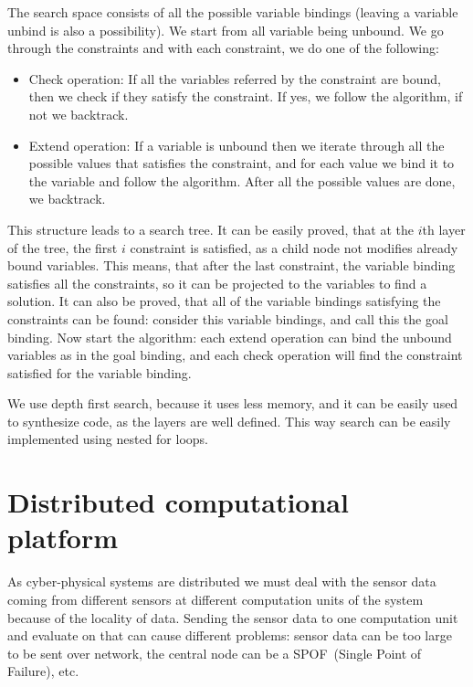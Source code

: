 The search space consists of all the possible variable bindings (leaving a variable unbind is also a possibility). 
We start from all variable being unbound. 
We go through the constraints and with each constraint, we do one of the following:
\begin{itemize}
	\item Check operation: If all the variables referred by the constraint are bound, then we check if they satisfy the constraint. If yes, we follow the algorithm, if not we backtrack.
	\item Extend operation: If a variable is unbound then we iterate through all the possible values that satisfies the constraint, and for each value we bind it to the variable and follow the algorithm. After all the possible values are done, we backtrack.
\end{itemize}

This structure leads to a search tree.
It can be easily proved, that at the $i$th layer of the tree, the first $i$ constraint is satisfied, as a child node not modifies already bound variables.
This means, that after the last constraint, the variable binding satisfies all the constraints, so it can be projected to the variables to find a solution.
It can also be proved, that all of the variable bindings satisfying the constraints can be found: 
consider this variable bindings, and call this the goal binding. Now start the algorithm: each extend operation can bind the unbound variables as in the goal binding, and each check operation will find the constraint satisfied for the variable binding.

We use depth first search, because it uses less memory, and it can be easily used to synthesize code, as the layers are well defined. This way search can be easily implemented using nested for loops.


\section{Distributed computational platform}


As cyber-physical systems are distributed we must deal with the sensor data coming from different sensors at different computation units of the system because of the locality of data. 
Sending the sensor data to one computation unit and evaluate on that can cause different problems: 
sensor data can be too large to be sent over network, the central node can be a SPOF~(Single Point of Failure), etc. 

